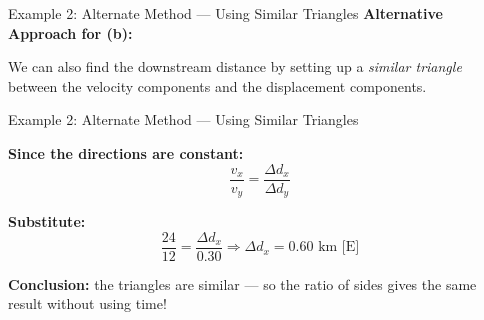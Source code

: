 \documentclass{beamer}
\begin{document}
\begin{frame}{Example 2: Alternate Method — Using Similar Triangles}
\textbf{Alternative Approach for (b):}

\vspace{0.3cm}

We can also find the downstream distance by setting up a \textit{similar triangle} between the velocity components and the displacement components.
 

\vspace{0.3cm}

\begin{center}
\end{center}

\end{frame}

\begin{frame}{Example 2: Alternate Method — Using Similar Triangles}

\textbf{Since the directions are constant:}
\[
\frac{v_x}{v_y} = \frac{\Delta d_x}{\Delta d_y}
\]

\vspace{0.3cm}

\textbf{Substitute:}
\[
\frac{24}{12} = \frac{\Delta d_x}{0.30}
\Rightarrow \Delta d_x = 0.60 \text{ km [E]}
\]

\vspace{0.4cm}

\vspace{0.3cm}

\textbf{Conclusion:} the triangles are similar — so the ratio of sides gives the same result without using time!
\end{frame}
\end{document}
